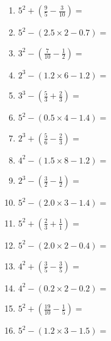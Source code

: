\documentclass[12pt]{article}
\begin{document}
\begin{enumerate}
\item \large $ 5^{2} + (\frac{9}{5} - \frac{3}{10}) = $ \vspace{1.6cm}
\item \large $ 5^{2} - (2.5 \times 2 - 0.7) = $ \vspace{1.6cm}
\item \large $ 3^{2} - (\frac{7}{10} - \frac{1}{2}) = $ \vspace{1.6cm}
\item \large $ 2^{3} - (1.2 \times 6 - 1.2) = $ \vspace{1.6cm}
\item \large $ 3^{3} - (\frac{5}{3} + \frac{2}{3}) = $ \vspace{1.6cm}
\item \large $ 5^{2} - (0.5 \times 4 - 1.4) = $ \vspace{1.6cm}
\newpage
\item \large $ 2^{3} + (\frac{5}{6} - \frac{2}{3}) = $ \vspace{1.6cm}
\item \large $ 4^{2} - (1.5 \times 8 - 1.2) = $ \vspace{1.6cm}
\item \large $ 2^{3} - (\frac{3}{2} - \frac{1}{2}) = $ \vspace{1.6cm}
\item \large $ 5^{2} - (2.0 \times 3 - 1.4) = $ \vspace{1.6cm}
\item \large $ 5^{2} + (\frac{2}{3} + \frac{1}{1}) = $ \vspace{1.6cm}
\item \large $ 5^{2} - (2.0 \times 2 - 0.4) = $ \vspace{1.6cm}
\item \large $ 4^{2} + (\frac{3}{5} - \frac{3}{5}) = $ \vspace{1.6cm}
\item \large $ 4^{2} - (0.2 \times 2 - 0.2) = $ \vspace{1.6cm}
\item \large $ 5^{2} + (\frac{19}{10} - \frac{1}{5}) = $ \vspace{1.6cm}
\item \large $ 5^{2} - (1.2 \times 3 - 1.5) = $ \vspace{1.6cm}
\end{enumerate}\newpage
\end{document}
